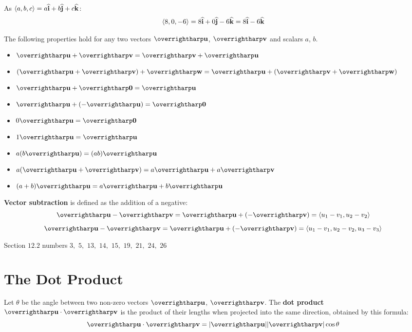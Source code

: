 \documentclass[letterpaper, twoside, 12pt]{book}
\begin{document}
          \begin{solution}
  As $\langle a,b,c\rangle=a\mathbf{\widehat{i}}+b\mathbf{\widehat{j}}+c\mathbf{\widehat{k}}$:
  \[
    \langle8,0,-6\rangle=8\mathbf{\widehat{i}}+0\mathbf{\widehat{j}}-6\mathbf{\widehat{k}}=8\mathbf{\widehat{i}}-6\mathbf{\widehat{k}}
  \]
          \end{solution}



\begin{theorem}
The following properties hold for any two vectors $\harpvec{u}$, $\harpvec{v}$
and scalars $a$, $b$.
  \begin{itemize}
  \item $\harpvec{u}+\harpvec{v} = \harpvec{v}+\harpvec{u}$
  \item $(\harpvec{u}+\harpvec{v})+\harpvec{w} = \harpvec{u}+(\harpvec{v}+\harpvec{w})$
  \item $\harpvec{u}+\harpvec{0} = \harpvec{u}$
  \item $\harpvec{u}+(-\harpvec{u}) = \harpvec{0}$
  \item $0\harpvec{u} = \harpvec{0}$
  \item $1\harpvec{u} = \harpvec{u}$
  \item $a(b\harpvec{u}) = (ab)\harpvec{u}$
  \item $a(\harpvec{u} + \harpvec{v}) = a\harpvec{u} + a\harpvec{v}$
  \item $(a+b)\harpvec{u} = a\harpvec{u} + b\harpvec{u}$
  \end{itemize}
\end{theorem}

\begin{definition}
  \textbf{Vector subtraction} is defined as the addition of a negative:
  \[
    \harpvec{u}-\harpvec{v}
      =
    \harpvec{u}+(-\harpvec{v})
      =
    \<u_1-v_1,u_2-v_2\>
  \]
  \[
    \harpvec{u}-\harpvec{v}
      =
    \harpvec{u}+(-\harpvec{v})
      =
    \<u_1-v_1,u_2-v_2,u_3-v_3\>
  \]
\end{definition}

\begin{suggestedHW}
Section $12.2$ numbers $3,$ $5,$ $13,$ $14,$ $15,$ $19,$ $21,$ $24,$ $26$
\end{suggestedHW}



\section{The Dot Product}

\begin{definition}
  Let $\theta$ be the angle between two non-zero vectors $\harpvec{u}$, $\harpvec{v}$.
  The \textbf{dot product} $\harpvec{u}\cdot\harpvec{v}$ is the product of their
  lengths when projected into the same direction, obtained by this formula:
  \[
    \harpvec{u} \cdot \harpvec{v} = |\harpvec{u}||\harpvec{v}|\cos \theta
  \]
\end{definition}
\end{document}
